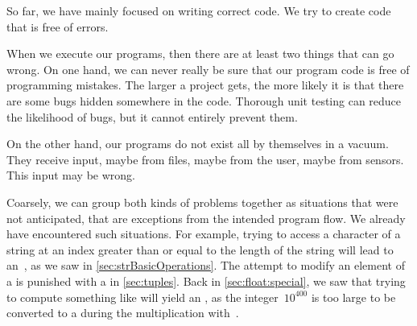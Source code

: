 %
\label{sec:exceptions}%
%
So far, we have mainly focused on writing correct code.
We try to create code that is free of errors.

When we execute our programs, then there are at least two things that can go wrong.
On one hand, we can never really be sure that our program code is free of programming mistakes.
The larger a project gets, the more likely it is that there are some bugs hidden somewhere in the code.
Thorough unit testing can reduce the likelihood of bugs, but it cannot entirely prevent them.

On the other hand, our programs do not exist all by themselves in a vacuum.
They receive input, maybe from files, maybe from the user, maybe from sensors.
This input may be wrong.

Coarsely, we can group both kinds of problems together as situations that were not anticipated, that are exceptions from the intended program flow.
We already have encountered such situations.
For example, trying to access a character of a string at an index greater than or equal to the length of the string will lead to an~, as we saw in \cref{sec:strBasicOperations}.
The attempt to modify an element of a  is punished with a  in \cref{sec:tuples}.
Back in \cref{sec:float:special}, we saw that trying to compute something like  will yield an , as the integer~$10^{400}$ is too large to be converted to a  during the multiplication with~.

